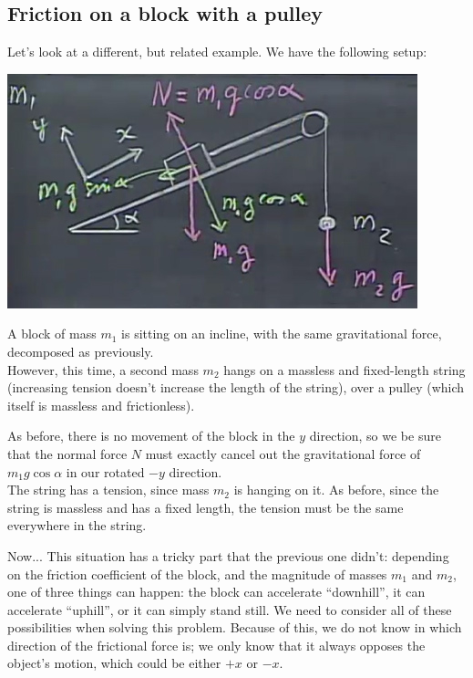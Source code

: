 \documentclass[8.01x]{subfiles}
\begin{document}
\subsection{Friction on a block with a pulley}

Let's look at a different, but related example. We have the following setup:

\begin{center}
\includegraphics[scale=0.8]{Graphics/lec8_friction_pulley}
\end{center}

A block of mass $m_1$ is sitting on an incline, with the same gravitational force, decomposed as previously.\\
However, this time, a second mass $m_2$ hangs on a massless and fixed-length string (increasing tension doesn't increase the length of the string), over a pulley (which itself is massless and frictionless).

As before, there is no movement of the  block in the $y$ direction, so we be sure that the normal force $N$ must exactly cancel out the gravitational force of $m_1 g \cos \alpha$ in our rotated $-y$ direction.\\
The string has a tension, since mass $m_2$ is hanging on it. As before, since the string is massless and has a fixed length, the tension must be the same everywhere in the string.

Now... This situation has a tricky part that the previous one didn't: depending on the friction coefficient of the block, and the magnitude of masses $m_1$ and $m_2$, one of three things can happen: the block can accelerate ``downhill'', it can accelerate ``uphill'', or it can simply stand still. We need to consider all of these possibilities when solving this problem. Because of this, we do not know in which direction of the frictional force is; we only know that it always opposes the object's motion, which could be either $+x$ or $-x$.
\end{document}
